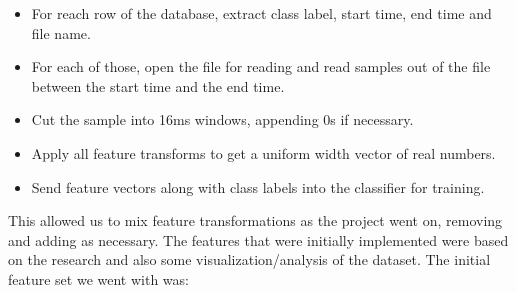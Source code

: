 \documentclass[ %
                    author={Sam Phippen},
                supervisor={Dr. Rafal Bogacz},
                     title={Real time voice activity detectors in noisy personal computing environments},
                  subtitle={},
                    degree={MEng},
                      year={2012} ]{thesis}
\begin{document}
\begin{itemize}

    \item For reach row of the database, extract class label, start time, end
        time and file name.

    \item For each of those, open the file for reading and read samples out of
        the file between the start time and the end time.

    \item Cut the sample into 16ms windows, appending 0s if necessary.

    \item Apply all feature transforms to get a uniform width vector of real
        numbers.

    \item Send feature vectors along with class labels into the classifier for
        training.

\end{itemize}

This allowed us to mix feature transformations as the project went on, removing
and adding as necessary. The features that were initially implemented were
based on the research and also some visualization/analysis of the dataset. The
initial feature set we went with was:
\end{document}
